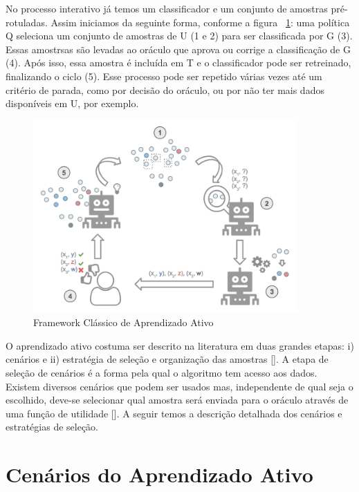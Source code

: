 No processo interativo já temos um classificador e um conjunto de amostras pré-rotuladas. Assim iniciamos da seguinte forma, conforme a figura ~\ref{fig:framework_AL_classico}: uma política Q seleciona um conjunto de amostras de U (1 e 2) para ser classificada por G (3). Essas amostrsas são levadas ao oráculo que aprova ou corrige a classificação de G (4). Após isso, essa amostra é incluída em T e o classificador pode ser retreinado, finalizando o ciclo (5). Esse processo pode ser repetido várias vezes até um critério de parada, como por decisão do oráculo, ou por não ter mais dados disponíveis em U, por exemplo. 


\begin{figure}
  \centering
  \includegraphics[width=0.9\textwidth]{figures/Framework_Active_Learning_Classico_v2.png}
  \caption{Framework Clássico de Aprendizado Ativo}
  \label{fig:framework_AL_classico}
\end{figure}


O aprendizado ativo costuma ser descrito na literatura em duas grandes etapas: i) cenários e ii) estratégia de seleção e organização das amostras [\cite{settles2014active}]. A etapa de seleção de cenários é a forma pela qual o algoritmo tem acesso aos dados. Existem diversos cenários que podem ser usados mas, independente de qual seja o escolhido, deve-se selecionar qual amostra será enviada para o oráculo através de uma função de utilidade [\cite{olsson2009literature, dasgupta2011two}]. A seguir temos a descrição detalhada dos cenários e estratégias de seleção. 


\section{Cenários do Aprendizado Ativo}
\label{sec:cenarios}

